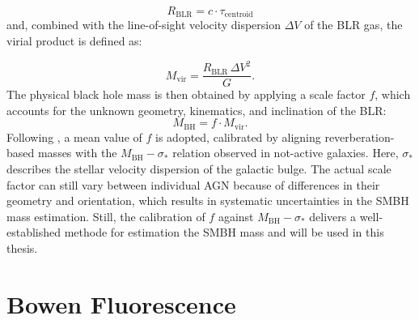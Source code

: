 \begin{equation}
	R_{\mathrm{BLR}} = c \cdot \tau_{\mathrm{centroid}}
\end{equation}
and, combined with the line-of-sight velocity dispersion $\Delta V$ of the BLR gas, the virial product is defined as:

\begin{equation}
	M_{\mathrm{vir}} = \frac{R_{\mathrm{BLR}}\,\Delta V^2}{G}.
\end{equation}
The physical black hole mass is then obtained by applying a scale factor $f$, which accounts for the unknown geometry, kinematics, and inclination of the BLR:
\begin{equation}
	M_{\mathrm{BH}} = f \cdot M_{\mathrm{vir}}.
\end{equation}
Following \textcite{onken2004}, a mean value of $f$ is adopted, calibrated by aligning reverberation-based masses with the $M_{\mathrm{BH}}-\sigma_*$ relation observed in not-active galaxies. Here, $\sigma_*$ describes the stellar velocity dispersion of the galactic bulge. The actual scale factor can still vary between individual AGN because of differences in their geometry and orientation, which results in systematic uncertainties in the SMBH mass estimation. Still, the calibration of $f$ against $M_{\mathrm{BH}}-\sigma_*$ delivers a well-established methode for estimation the SMBH mass and will be used in this thesis.



\section{Bowen Fluorescence}
\label{sec:bowen_fluorescence}

